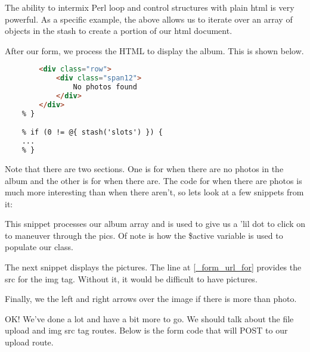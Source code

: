 \documentclass[14pt]{extreport}
\begin{document}


The ability to intermix Perl loop and control structures with plain html is
very powerful. As a specific example, the above allows us to iterate over an 
array of objects in the stash to create a portion of our html document.

After our form, we process the HTML to display the album.  This is shown below.

\begin{lstlisting}[caption={Display album}, language=Html]
    % if (0 == @{ stash('slots') }) {
        <div class="row">
            <div class="span12">
                No photos found
            </div>
        </div>
    % }

    % if (0 != @{ stash('slots') }) {
    ...
    % }
\end{lstlisting}

Note that there are two sections.  One is for when there are no photos in the
album and the other is for when there are.  The code for when there are photos
is much more interesting than when there aren't, so lets look at a few snippets
from it:

This snippet processes our album array and is used to give us a 'lil dot to
click on to maneuver through the pics.  Of note is how the \$active variable is
used to populate our class.



The next snippet displays the pictures. The line at \ref{_form_url_for} provides the 
src for the img tag. Without it, it would be difficult to have pictures.



Finally, we the left and right arrows over the image if there is more than photo.



OK!  We've done a lot and have a bit more to go.  We should talk about the file upload
and img src tag routes.  Below is the form code that will POST to our upload route.


\end{document}
